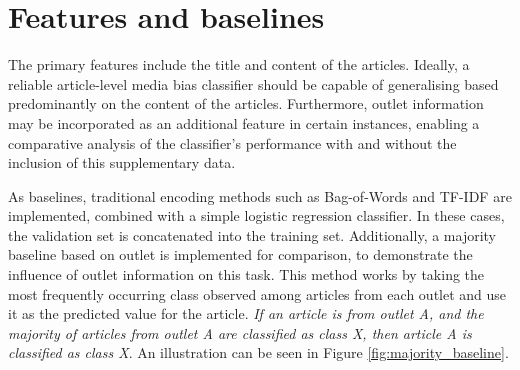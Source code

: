 \section{Features and baselines}

The primary features include the title and content of the articles. Ideally, a reliable article-level media bias classifier should be capable of generalising based predominantly on the content of the articles. Furthermore, outlet information may be incorporated as an additional feature in certain instances, enabling a comparative analysis of the classifier's performance with and without the inclusion of this supplementary data.

As baselines, traditional encoding methods such as Bag-of-Words and TF-IDF are implemented, combined with a simple logistic regression classifier. In these cases, the validation set is concatenated into the training set. Additionally, a majority baseline based on outlet is implemented for comparison, to demonstrate the influence of outlet information on this task. This method works by taking the most frequently occurring class observed among articles from each outlet and use it as the predicted value for the article. \textit{If an article is from outlet A, and the majority of articles from outlet A are classified as class X, then article A is classified as class X}. An illustration can be seen in Figure \ref{fig:majority_baseline}.



